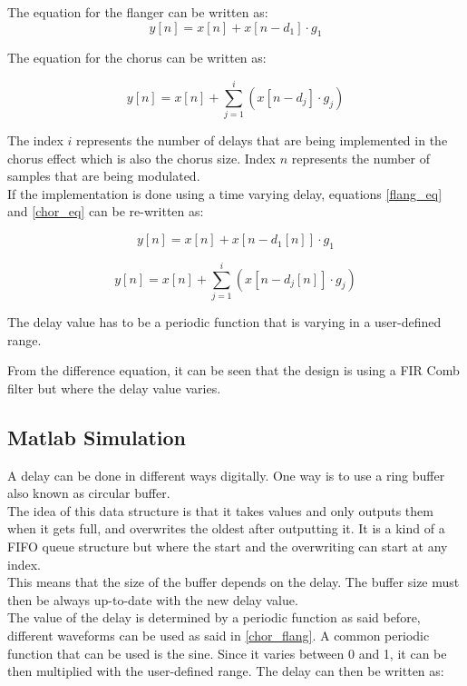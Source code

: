 The equation for the flanger can be written as:
\begin{equation}
\label{flang_eq}
		y[n] = x[n] + x[n- d_{1}] \cdot g_{1}  
\end{equation}

The equation for the chorus can be written as:

\begin{equation}
\label{chor_eq}
y[n] = x[n] + \sum_{j=1}^{i}  (x[n- d_{j}] \cdot g_{j})
\end{equation}

The index $i$ represents the number of delays that are being implemented in the chorus effect which is also the chorus size. Index $n$ represents the number of samples that are being modulated. \\
If the implementation is done using a time varying delay, equations \ref{flang_eq} and \ref{chor_eq} can be re-written as:

\begin{equation}
\label{flang_eq2}
y[n] = x[n] + x[n- d_{1}[n]] \cdot g_{1}  
\end{equation}

\begin{equation}
\label{chor_eq2}
y[n] = x[n] + \sum_{j=1}^{i}  (x[n- d_{j}[n]] \cdot g_{j})
\end{equation}

The delay value has to be a periodic function that is varying in a user-defined range. 

From the difference equation, it can be seen that the design is using a FIR Comb filter but where the delay value varies. 


\subsection{Matlab Simulation}

A delay can be done in different ways digitally. One way is to use a ring buffer also known as circular buffer. \\
The idea of this data structure is that it takes values and only outputs them when it gets full, and overwrites the oldest after outputting it. It is a kind of a FIFO queue structure but where the start and the overwriting can start at any index. \\
This means that the size of the buffer depends on the delay.  The buffer size must then be always up-to-date with the new delay value. \\ 
The value of the delay is determined by a periodic function as said before, different waveforms can be used as said in \autoref{chor_flang}. A common periodic function that can be used is the sine. Since it varies between 0 and 1, it can be then multiplied with the user-defined range. 
The delay can then be written as:


